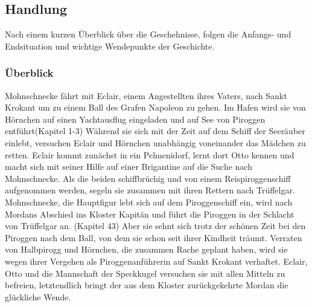 \subsection{Handlung}
Nach einem kurzen Überblick über die Geschehnisse, folgen die Anfangs- und Endsituation und wichtige Wendepunkte der Geschichte.

\subsubsection{Überblick}
Mohnschnecke fährt mit Eclair, einem Angestellten ihres Vaters, nach Sankt Krokant um zu einem Ball des 
Grafen Napoleon zu gehen. Im Hafen wird sie von Hörnchen auf einen Yachtausflug eingeladen und auf See von 
Piroggen entführt(Kapitel 1-3) 
Während sie sich mit der Zeit auf dem Schiff der Seeräuber einlebt, versuchen Eclair 
und Hörnchen unabhängig voneinander das Mädchen zu retten. Eclair kommt zunächst in ein Pelmenidorf, lernt 
dort Otto kennen und macht sich mit seiner Hilfe auf einer Brigantine auf die Suche nach Mohnschnecke. 
Als die beiden schiffbrüchig und von einem Reispiroggenschiff aufgenommen werden, segeln sie zusammen mit 
ihren Rettern nach Trüffelgar. Mohnschnecke, die Hauptfigur lebt sich auf dem Piroggenschiff ein, wird nach 
Mordans Abschied ins Kloster Kapitän und führt die Piroggen in der Schlacht von Trüffelgar an. (Kapitel 43) 
Aber sie sehnt sich trotz der schönen Zeit bei den Piroggen nach dem Ball, von dem sie schon seit ihrer Kindheit 
träumt. \cite[S.521]{pir} Verraten von Halbpirogg und Hörnchen, die zusammen Rache geplant haben, wird sie wegen ihrer Vergehen als 
Piroggenanführerin auf Sankt Krokant verhaftet. Eclair, Otto und die Mannschaft der Speckkugel versuchen sie mit allen Mitteln zu 
befreien, letztendlich bringt der aus dem Kloster zurückgekehrte Mordan die glückliche Wende.

